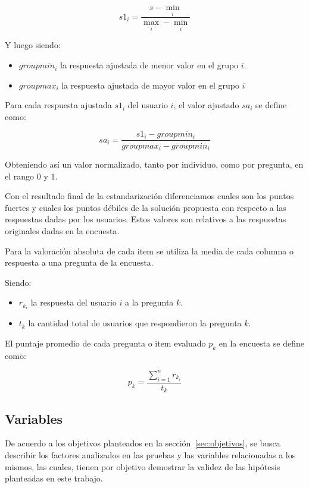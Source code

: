 \begin{equation*}
s1_i=\frac{s-\min_i}{\max_i-\min_i}
\end{equation*}

Y luego siendo:
\begin{itemize}
	\item $groupmin_i$ la respuesta ajustada de menor valor en el grupo $i$.
	\item $groupmax_i$ la respuesta ajustada de mayor valor en el grupo $i$
\end{itemize}

Para cada respuesta ajustada $s1_i$ del usuario $i$, el valor ajustado $sa_i$ se
define como:	

\begin{equation*}
sa_i=\frac{s1_i-groupmin_i}{groupmax_i-groupmin_i}
\end{equation*}

Obteniendo así un valor normalizado, tanto por individuo, como por pregunta, en
el rango $0$ y $1$.

Con el resultado final de la estandarización diferenciamos cuales son los
puntos fuertes y cuales los puntos débiles de la solución propuesta con
respecto a las respuestas dadas por los usuarios. Estos valores son relativos a
las respuestas originales dadas en la encuesta.

Para la valoración absoluta de cada  item se utiliza la media de cada columna o
respuesta a una pregunta de la encuesta.

Siendo:
\begin{itemize} 
\item $r_{k_i}$ la respuesta del usuario $i$ a la pregunta $k$.
\item $t_k$ la cantidad total de usuarios que respondieron la pregunta $k$.
\end{itemize}

El puntaje promedio de cada pregunta o item evaluado  $p_k$ en la encuesta se
define como:

\begin{equation*}
p_k = \frac{\sum_{i=1}^n{r_{k_i}}}{t_k}
\end{equation*}

\subsection{Variables}
\label{sec:variables}

De acuerdo a los objetivos planteados en la sección~\ref{sec:objetivos}, se
busca describir los factores analizados en las pruebas y las variables
relacionadas a los mismos, las cuales, tienen por objetivo demostrar la validez
de las hipótesis planteadas en este trabajo.


